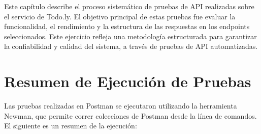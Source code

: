 \documentclass{report}
\begin{document}
Este capítulo describe el proceso sistemático de pruebas de API realizadas sobre el servicio de Todo.ly. El objetivo principal de estas pruebas fue evaluar la funcionalidad, el rendimiento y la estructura de las respuestas en los endpoints seleccionados. Este ejercicio refleja una metodología estructurada para garantizar la confiabilidad y calidad del sistema, a través de pruebas de API automatizadas.

\section{Resumen de Ejecución de Pruebas}
Las pruebas realizadas en Postman se ejecutaron utilizando la herramienta Newman, que permite correr colecciones de Postman desde la línea de comandos. El siguiente es un resumen de la ejecución:
\end{document}
